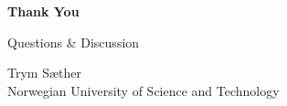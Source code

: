 \documentclass[aspectratio=169]{beamer}
\begin{document}


\begin{frame}[plain]
    \vfill
    \centering
    {\Huge \textcolor{primary}{\textbf{Thank You}}}
    
    \vspace{1.5em}
    
    {\Large Questions \& Discussion}
    
    \vspace{2em}
    
    {\normalsize 
    \textcolor{textlight}{
        Trym Sæther \\
        Norwegian University of Science and Technology
    }}
    \vfill
\end{frame}
\end{document}
